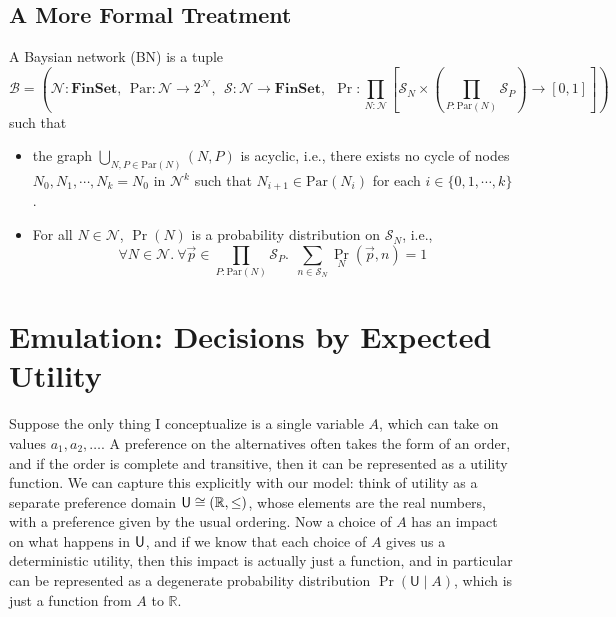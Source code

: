 \documentclass{article}
\begin{document}
	\subsection{A More Formal Treatment}
	\begin{defn}
		A Baysian network (BN) is a tuple
		\[
		\mathcal B = \left(\mathcal N : \mathbf{FinSet}, ~~\mathrm{Par}: \mathcal N \to 2^{\mathcal N},~~ \mathcal S: \mathcal N \to \mathbf{FinSet},~~\Pr: \prod_{N : \mathcal N}  \left[ \mathcal S_N \times \left(\prod_{P : \mathrm{Par}(N)} \mathcal S_P\right)  \to [0,1] \right] \right)
		\]
		such that
		\begin{itemize}[nosep]
			\item the graph $\bigcup_{N, P \in \mathrm{Par}(N)}(N, P)$ is acyclic, i.e., there exists no cycle of nodes $N_0, N_1, \cdots, N_k = N_0$ in $\mathcal N^k$ such that $N_{i+1} \in \mathrm{Par}(N_i)$ for each $i \in \{0, 1, \cdots, k\}$.
			\item For all $N \in \mathcal N$, $\Pr(N)$ is a probability distribution on $\mathcal S_N$, i.e., 
			\[ \forall N\in \mathcal N.~\forall \vec{p} \in {\prod_{P : \mathrm{Par}(N)} \mathcal S_P}.~~ \sum_{n \in \mathcal S_{N}} \Pr_N(\vec{p}, n) = 1\]
		\end{itemize}
	\end{defn}



	\section{Emulation: Decisions by Expected Utility}
	
	Suppose the only thing I conceptualize is a single variable $A$, which can take on values $a_1, a_2, \ldots$. A preference on the alternatives often takes the form of an order, and if the order is complete and transitive, then it can be represented as a utility function. We can capture this explicitly with our model: think of utility as a separate preference domain $\sf U \cong (\mathbb R, \leq)$, whose elements are the real numbers, with a preference given by the usual ordering. Now a choice of $A$ has an impact on what happens in $\sf U$, and if we know that each choice of $A$ gives us a deterministic utility, then this impact is actually just a function, and in particular can be represented as a degenerate probability distribution $\Pr( \mathsf U \mid A)$, which is just a function from $A$ to $\mathbb R$.
	
	\begin{center}
	\end{center}
\end{document}
